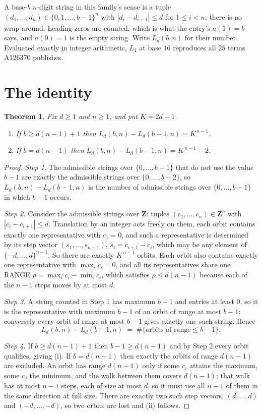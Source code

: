 \documentclass[11pt,a4paper]{article}
\theoremstyle{plain}
\newtheorem{theorem}{Theorem}
\theoremstyle{definition}
\begin{document}
A base-$b$ $n$-digit string in this family's sense is a tuple
$(d_1,\dots,d_n)\in\{0,1,\dots,b-1\}^{n}$ with $|d_i-d_{i+1}|\le d$ for $1\le i<n$; there
is no wrap-around. Leading zeros are counted, which is what the entry's $a(1)=b$ says, and
$a(0)=1$ is the empty string. Write $L_d(b,n)$ for their number. Evaluated exactly in integer
arithmetic, $L_{1}$ at base $16$ reproduces all $25$ terms A126370 publishes.

\section{The identity}

\begin{theorem}
Fix $d\ge1$ and $n\ge1$, and put $K=2d+1$.
\begin{enumerate}
\item[(i)] If $b\ge d(n-1)+1$ then $L_d(b,n)-L_d(b-1,n)=K^{\,n-1}$.
\item[(ii)] If $b=d(n-1)$ then $L_d(b,n)-L_d(b-1,n)=K^{\,n-1}-2$.
\end{enumerate}
\end{theorem}

\begin{proof}
\emph{Step 1.} The admissible strings over $\{0,\dots,b-1\}$ that do not use the value $b-1$
are exactly the admissible strings over $\{0,\dots,b-2\}$, so $L_d(b,n)-L_d(b-1,n)$ is the
number of admissible strings over $\{0,\dots,b-1\}$ in which $b-1$ occurs.

\emph{Step 2.} Consider the admissible strings over $\mathbf{Z}$: tuples
$(c_1,\dots,c_n)\in\mathbf{Z}^{n}$ with $|c_i-c_{i+1}|\le d$. Translation by an integer acts
freely on them, each orbit contains exactly one representative with $c_1=0$, and such a
representative is determined by its step vector $(s_1,\dots,s_{n-1})$, $s_i=c_{i+1}-c_i$,
which may be any element of $\{-d,\dots,d\}^{n-1}$. So there are exactly $K^{\,n-1}$ orbits.
Each orbit also contains exactly one representative with $\max_i c_i=0$, and all its
representatives share one RANGE $\rho=\max_ic_i-\min_ic_i$, which satisfies
$\rho\le d(n-1)$ because each of the $n-1$ steps moves by at most $d$.

\emph{Step 3.} A string counted in Step 1 has maximum $b-1$ and entries at least $0$, so it is
the representative with maximum $b-1$ of an orbit of range at most $b-1$; conversely every orbit
of range at most $b-1$ gives exactly one such string. Hence
\[
L_d(b,n)-L_d(b-1,n)\;=\;\#\{\text{orbits of range}\le b-1\} .
\]

\emph{Step 4.} If $b\ge d(n-1)+1$ then $b-1\ge d(n-1)$ and by Step 2 every orbit qualifies,
giving (i). If $b=d(n-1)$ then exactly the orbits of range $d(n-1)$ are excluded. An orbit has
range $d(n-1)$ only if some $c_i$ attains the maximum, some $c_j$ the minimum, and the walk
between them covers $d(n-1)$; that walk has at most $n-1$ steps, each of size at most $d$, so it
must use all $n-1$ of them in the same direction at full size. There are exactly two such step
vectors, $(d,\dots,d)$ and $(-d,\dots,-d)$, so two orbits are lost and (ii) follows.
\end{proof}
\end{document}
